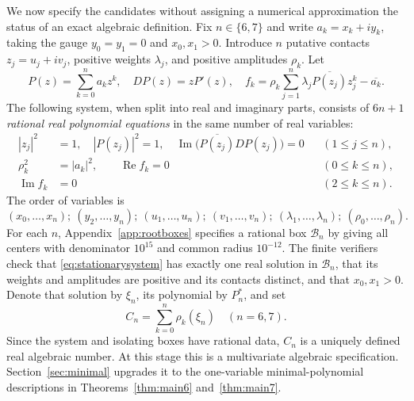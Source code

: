 \documentclass[11pt]{article}
\DeclareMathOperator{\Rea}{Re}
\DeclareMathOperator{\Ima}{Im}
\begin{document}
We now specify the candidates without assigning a numerical approximation the status of an exact algebraic definition.  Fix $n\in\{6,7\}$ and write $a_k=x_k+iy_k$, taking the gauge $y_0=y_1=0$ and $x_0,x_1>0$.  Introduce $n$ putative contacts $z_j=u_j+iv_j$, positive weights $\lambda_j$, and positive amplitudes $\rho_k$.  Let
\[
 P(z)=\sum_{k=0}^n a_kz^k,\quad D P(z)=zP'(z),\quad
 f_k=\rho_k\sum_{j=1}^n\lambda_j\overline{P(z_j)}z_j^k-\overline{a_k}.
\]
The following system, when split into real and imaginary parts, consists of $6n+1$ \emph{rational real polynomial equations} in the same number of real variables:
\begin{equation}\label{eq:stationarysystem}
\begin{aligned}
 |z_j|^2&=1,\quad |P(z_j)|^2=1,\quad
 \Ima\bigl(\overline{P(z_j)}DP(z_j)\bigr)=0 &&(1\le j\le n),\\
 \rho_k^2&=|a_k|^2,\qquad \Rea f_k=0 &&(0\le k\le n),\\
 \Ima f_k&=0 &&(2\le k\le n).
\end{aligned}
\end{equation}
The order of variables is
\begin{equation}\label{eq:variableorder}
 (x_0,\ldots,x_n);\ (y_2,\ldots,y_n);\ (u_1,\ldots,u_n);\
 (v_1,\ldots,v_n);\ (\lambda_1,\ldots,\lambda_n);\ (\rho_0,\ldots,\rho_n).
\end{equation}
For each $n$, Appendix~\ref{app:rootboxes} specifies a rational box $\mathcal B_n$ by giving all centers with denominator $10^{15}$ and common radius $10^{-12}$.  The finite verifiers check that \eqref{eq:stationarysystem} has exactly one real solution in $\mathcal B_n$, that its weights and amplitudes are positive and its contacts distinct, and that $x_0,x_1>0$.  Denote that solution by $\xi_n$, its polynomial by $P_n^*$, and set
\begin{equation}\label{eq:Cn}
 C_n=\sum_{k=0}^n\rho_k(\xi_n)\quad(n=6,7).
\end{equation}
Since the system and isolating boxes have rational data, $C_n$ is a uniquely defined real algebraic number.  At this stage this is a multivariate algebraic specification. Section~\ref{sec:minimal} upgrades it to the one-variable minimal-polynomial descriptions in Theorems~\ref{thm:main6} and~\ref{thm:main7}.
\end{document}
